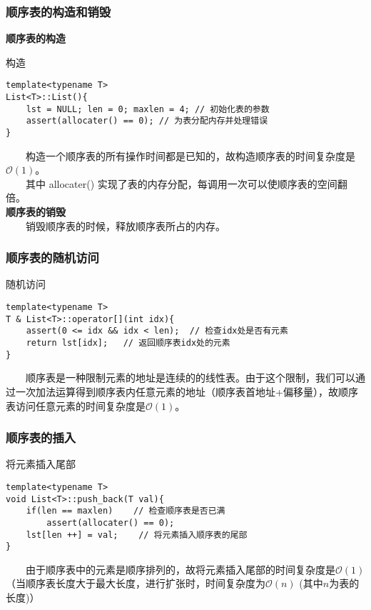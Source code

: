 \documentclass{beamer}
\begin{document}
	\begin{frame}[fragile]\frametitle{顺序表的构造和销毁}
		\textbf{顺序表的构造}
		\begin{block}{构造}
\begin{verbatim}
template<typename T>
List<T>::List(){
    lst = NULL; len = 0; maxlen = 4; // 初始化表的参数
    assert(allocater() == 0); // 为表分配内存并处理错误
}
\end{verbatim}
		\end{block}
		\ \ \ \ 构造一个顺序表的所有操作时间都是已知的，故构造顺序表的时间复杂度是$\mathcal{O}(1)$。\\
		\ \ \ \ 	其中 allocater() 实现了表的内存分配，每调用一次可以使顺序表的空间翻倍。\\
		\textbf{顺序表的销毁}\\
		\ \ \ \ 销毁顺序表的时候，释放顺序表所占的内存。
	\end{frame}

	\begin{frame}[fragile]\frametitle{顺序表的随机访问}
		\begin{block}{随机访问}
\begin{verbatim}
template<typename T>
T & List<T>::operator[](int idx){
    assert(0 <= idx && idx < len);  // 检查idx处是否有元素
    return lst[idx];   // 返回顺序表idx处的元素
}
\end{verbatim}
		\end{block}
		\ \ \ \ 顺序表是一种限制元素的地址是连续的的线性表。由于这个限制，我们可以通过一次加法运算得到顺序表内任意元素的地址（顺序表首地址+偏移量），故顺序表访问任意元素的时间复杂度是$\mathcal{O}(1)$。
	\end{frame}

	\begin{frame}[fragile]\frametitle{顺序表的插入}
		\begin{block}{将元素插入尾部}
\begin{verbatim}
template<typename T>
void List<T>::push_back(T val){
    if(len == maxlen)    // 检查顺序表是否已满
        assert(allocater() == 0);
    lst[len ++] = val;    // 将元素插入顺序表的尾部
}
\end{verbatim}
		\end{block}
		\ \ \ \ 由于顺序表中的元素是顺序排列的，故将元素插入尾部的时间复杂度是$\mathcal{O}(1)$（当顺序表长度大于最大长度，进行扩张时，时间复杂度为$\mathcal{O}(n)$ (其中$n$为表的长度)）
	\end{frame}
\end{document}
